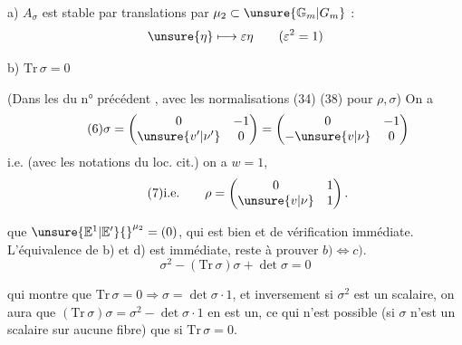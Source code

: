 a) $A_\sigma$ est stable par translations par
$\mu_2\subset\unsure{\mathbb G_m|G_m}$ :
\[
\unsure{\eta}\longmapsto\varepsilon\eta\qquad(\varepsilon^2=1)
\]

b) $\mathrm{Tr}\,\sigma=0$


 (Dans les  du n° précédent
,
avec les normalisations (34) (38) pour $\rho,\sigma$) On a
\[
\tag{6}
\sigma=\begin{pmatrix}0&-1\\\unsure{v'|\nu'}&0\end{pmatrix}
=\begin{pmatrix}0&-1\\-\unsure{v|\nu}&0\end{pmatrix}
\]
i.e. (avec les notations du loc. cit.) on a $w=1$,
\[
\tag{7}
\text{i.e.}\qquad
\rho=\begin{pmatrix}0&1\\\unsure{v|\nu}&1\end{pmatrix}.
\]



que $\unsure{\mathbb E^1|\mathbb E'}{}^{\mu_2}=(0)$, qui est bien
 et de vérification immédiate.
L'équivalence de b) et d) est immédiate, reste à prouver
$b)\Longleftrightarrow c)$.
\[
\sigma^2-(\mathrm{Tr}\,\sigma)\sigma+\det\sigma=0
\]


qui montre que $\mathrm{Tr}\,\sigma=0\Longrightarrow\sigma=\det\sigma\cdot1$,
et inversement si $\sigma^2$ est un scalaire, on aura que
$(\mathrm{Tr}\,\sigma)\sigma=\sigma^2-\det\sigma\cdot1$ en est un,
ce qui n'est possible (si $\sigma$ n'est  un scalaire sur aucune
fibre) que si $\mathrm{Tr}\,\sigma=0$.

